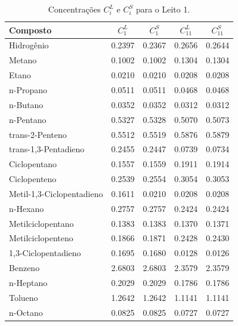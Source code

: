 \begin{table}[!htb]
\begin{center}
\caption{Concentrações $C^L_{i}$ e $C^S_{i}$ para o Leito 1.}
\label{tab:concentraçõesparaoleito1}
\small
\begin{tabular}{lcccc}
{Composto} & {$C^{L}_{1}$} & {$C^{S}_{1}$} & {$C^{L}_{11}$} & {$C^{S}_{11}$}
\\
\hline
{Hidrogênio} & \num{0,2397} & \num{0,2367} & \num{0,2656} & \num{0,2644} \\
{Metano} & \num{0,1002} & \num{0,1002} & \num{0,1304} & \num{0,1304} \\
{Etano} & \num{0,0210} & \num{0,0210} & \num{0,0208} & \num{0,0208} \\
{n-Propano} & \num{0,0511} & \num{0,0511} & \num{0,0468} & \num{0,0468} \\
{n-Butano} & \num{0,0352} & \num{0,0352} & \num{0,0312} & \num{0,0312} \\
{n-Pentano} & \num{0,5327} & \num{0,5328} & \num{0,5070} & \num{0,5073} \\
{trans-2-Penteno} & \num{0,5512} & \num{0,5519} & \num{0,5876} & \num{0,5879} \\
{trans-1,3-Pentadieno} & \num{0,2455} & \num{0,2447} & \num{0,0739} &
\num{0,0734}
\\
{Ciclopentano} & \num{0,1557} & \num{0,1559} & \num{0,1911} & \num{0,1914} \\
{Ciclopenteno} & \num{0,2539} & \num{0,2554} & \num{0,3054} & \num{0,3053} \\
{Metil-1,3-Ciclopentadieno} & \num{0,1611} & \num{0,0210} & \num{0,0208} &
\num{0,0208}
\\
{n-Hexano} & \num{0,2757} & \num{0,2757} & \num{0,2424} & \num{0,2424} \\
{Metilciclopentano} & \num{0,1383} & \num{0,1383} & \num{0,1370} & \num{0,1371}
\\
{Metilciclopenteno} & \num{0,1866} & \num{0,1871} & \num{0,2428} & \num{0,2430}
\\
{1,3-Ciclopentadieno} & \num{0,1695} & \num{0,1680} & \num{0,0128} &
\num{0,0126}
\\
{Benzeno} & \num{2,6803} & \num{2,6803} & \num{2,3579} & \num{2,3579} \\
{n-Heptano} & \num{0,2029} & \num{0,2029} & \num{0,1786} & \num{0,1786} \\
{Tolueno} & \num{1,2642} & \num{1,2642} & \num{1,1141} & \num{1,1141} \\
{n-Octano} & \num{0,0825} & \num{0,0825} & \num{0,0727} & \num{0,0727} \\

\end{tabular}
\end{center}
\end{table}
